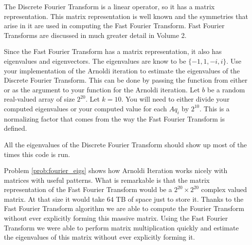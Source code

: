\begin{problem}
\label{prob:fourier_eigs}
The Discrete Fourier Transform is a linear operator, so it has a matrix representation.
This matrix representation is well known and the symmetries that arise in it are used in computing the Fast Fourier Transform.
Fast Fourier Transforms are discussed in much greater detail in Volume 2.

Since the Fast Fourier Transform has a matrix representation, it also has eigenvalues and eigenvectors.
The eigenvalues are know to be $\lbrace -1, 1, -i, i \rbrace$.
Use your implementation of the Arnoldi iteration to estimate the eigenvalues of the Discrete Fourier Transform.
This can be done by passing the  function from either  or  as the argument  to your function for the Arnoldi iteration.
Let $b$ be a random real-valued array of size $2^{20}$.
Let $k = 10$.
You will need to either divide your computed eigenvalues or your computed value for each $A q_i$ by $2^{10}$.
This is a normalizing factor that comes from the way the Fast Fourier Transform is defined.

All the eigenvalues of the Discrete Fourier Transform should show up most of the times this code is run.
\end{problem}

Problem \ref{prob:fourier_eigs} shows how Arnoldi Iteration works nicely with matrices with useful patterns.
What is remarkable is that the matrix representation of the Fast Fourier Transform would be a $2^20 \times 2^20$ complex valued matrix.
At that size it would take $64$ TB of space just to store it.
Thanks to the Fast Fourier Transform algorithm we are able to compute the Fourier Transform without ever explicitly forming this massive matrix.
Using the Fast Fourier Transform we were able to perform matrix multiplication quickly and estimate the eigenvalues of this matrix without ever explicitly forming it.


